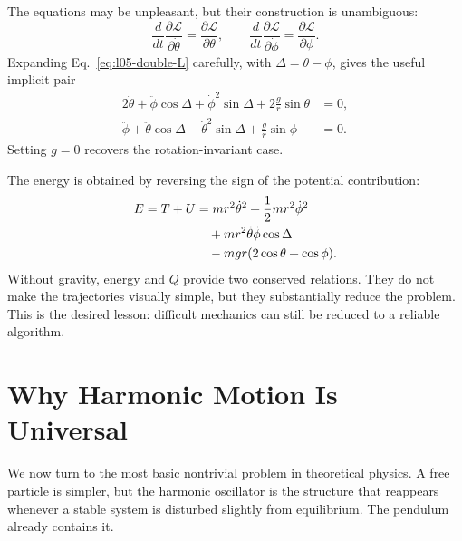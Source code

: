 The equations may be unpleasant, but their construction is unambiguous:
\begin{equation}
 \frac{d}{dt}\frac{\partial\mathcal L}{\partial\dot\theta}
 =\frac{\partial\mathcal L}{\partial\theta},
 \qquad
 \frac{d}{dt}\frac{\partial\mathcal L}{\partial\dot\phi}
 =\frac{\partial\mathcal L}{\partial\phi}.
 \label{eq:l05-double-EL}
\end{equation}
Expanding Eq.~\eqref{eq:l05-double-L} carefully, with
\(\Delta=\theta-\phi\), gives the useful implicit pair
\begin{align}
 2\ddot\theta+\ddot\phi\cos\Delta
 +\dot\phi^2\sin\Delta
 +2\frac{g}{r}\sin\theta&=0,\\
 \ddot\phi+\ddot\theta\cos\Delta
 -\dot\theta^2\sin\Delta
 +\frac{g}{r}\sin\phi&=0.
 \label{eq:l05-double-expanded}
\end{align}
Setting \(g=0\) recovers the rotation-invariant case.

\begin{classroomqa}
\end{classroomqa}

The energy is obtained by reversing the sign of the potential contribution:
\begin{align}
 E=T+U
 &=mr^2\dot\theta^2+\frac12mr^2\dot\phi^2\notag\\
 &\quad+mr^2\dot\theta\dot\phi\cos\Delta\notag\\
 &\quad
 -mgr(2\cos\theta+\cos\phi).
\end{align}
Without gravity, energy and \(Q\) provide two conserved relations. They do not
make the trajectories visually simple, but they substantially reduce the
problem. This is the desired lesson: difficult mechanics can still be reduced
to a reliable algorithm.

\section{Why Harmonic Motion Is Universal}

We now turn to the most basic nontrivial problem in theoretical physics. A
free particle is simpler, but the harmonic oscillator is the structure that
reappears whenever a stable system is disturbed slightly from equilibrium.
The pendulum already contains it.

